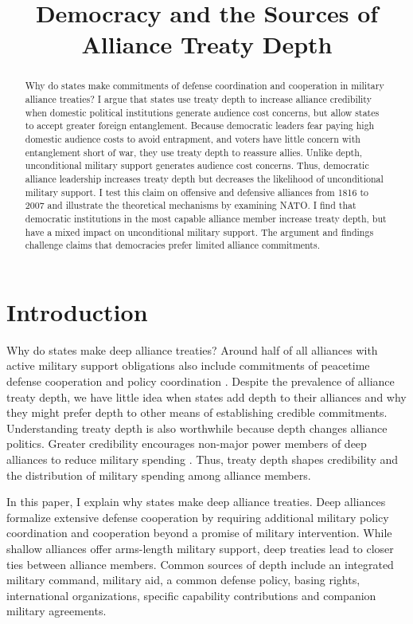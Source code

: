 \documentclass[12pt]{article}
\title{\textbf{Democracy and the Sources of Alliance Treaty Depth}}
\date{}
\begin{document}
\maketitle 

\doublespace 

\begin{abstract}
Why do states make commitments of defense coordination and cooperation in military alliance treaties? 
I argue that states use treaty depth to increase alliance credibility when domestic political institutions generate audience cost concerns, but allow states to accept greater foreign entanglement. 
Because democratic leaders fear paying high domestic audience costs to avoid entrapment, and voters have little concern with entanglement short of war, they use treaty depth to reassure allies. 
Unlike depth, unconditional military support generates audience cost concerns. 
Thus, democratic alliance leadership increases treaty depth but decreases the likelihood of unconditional military support. 
I test this claim on offensive and defensive alliances from 1816 to 2007 and illustrate the theoretical mechanisms by examining NATO. 
I find that democratic institutions in the most capable alliance member increase treaty depth, but have a mixed impact on unconditional military support. 
The argument and findings challenge claims that democracies prefer limited alliance commitments. 
\end{abstract}


\newpage 


\section{Introduction}


Why do states make deep alliance treaties? 
Around half of all alliances with active military support obligations also include commitments of peacetime defense cooperation and policy coordination \citep{Leedsetal2002}. 
Despite the prevalence of alliance treaty depth, we have little idea when states add depth to their alliances and why they might prefer depth to other means of establishing credible commitments.
Understanding treaty depth is also worthwhile because depth changes alliance politics. 
Greater credibility encourages non-major power members of deep alliances to reduce military spending \citep{Alley2020}.  
Thus, treaty depth shapes credibility and the distribution of military spending among alliance members. 


In this paper, I explain why states make deep alliance treaties. 
Deep alliances formalize extensive defense cooperation by requiring additional military policy coordination and cooperation beyond a promise of military intervention. 
While shallow alliances offer arms-length military support, deep treaties lead to closer ties between alliance members. 
Common sources of depth include an integrated military command, military aid, a common defense policy, basing rights, international organizations, specific capability contributions and companion military agreements. 
\end{document}
